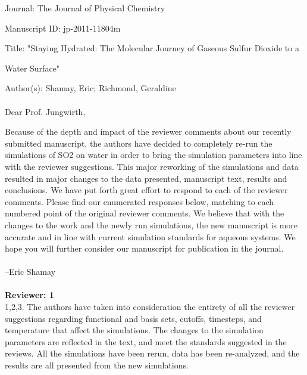 \documentclass{article}
\begin{document}
Journal: The Journal of Physical Chemistry 

Manuscript ID: jp-2011-11804m 

Title: "Staying Hydrated: The Molecular Journey of Gaseous Sulfur Dioxide to a 

Water Surface" 

Author(s): Shamay, Eric; Richmond, Geraldine 
\\ \\
Dear Prof. Jungwirth,

Because of the depth and impact of the reviewer comments about our recently submitted manuscript, the authors have decided to completely re-run the simulations of SO2 on water in order to bring the simulation parameters into line with the reviewer suggestions. This major reworking of the simulations and data resulted in major changes to the data presented, manuscript text, results and conclusions. We have put forth great effort to respond to each of the reviewer comments. Please find our enumerated responses below, matching to each numbered point of the original reviewer comments. We believe that with the changes to the work and the newly run simulations, the new manuscript is more accurate and in line with current simulation standards for aqueous systems. We hope you will further consider our manuscript for publication in the journal.
\\ \\

--Eric Shamay \\ \\


\textbf{Reviewer: 1} \\

1,2,3. The authors have taken into consideration the entirety of all the reviewer suggestions regarding functional and basis sets, cutoffs, timesteps, and temperature that affect the simulations. The changes to the simulation parameters are reflected in the text, and meet the standards suggested in the reviews. All the simulations have been rerun, data has been re-analyzed, and the results are all presented from the new simulations.
\\

\end{document}
